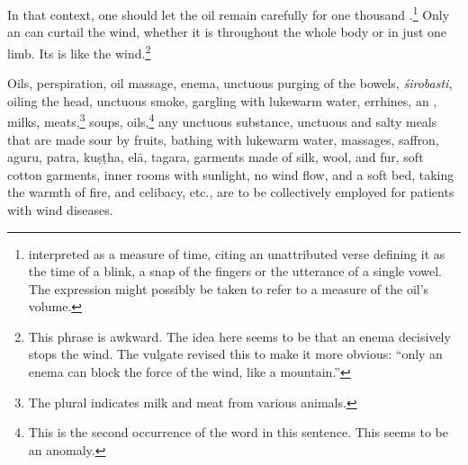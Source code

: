 \begin{translation}
    
    
     \item[20--21ab] 
     
     In that context, one should let the oil remain carefully for 
one thousand .\footnote{
    interpreted  as a measure of time, citing an
    unattributed verse defining it as the time of a blink, a snap of
    the fingers or the utterance of a single vowel. The expression
    might possibly be taken to refer to a measure of the oil's
    volume.} Only an  can curtail the wind,  whether
    it is throughout the whole body or in just one limb.  Its
     is like the wind.\footnote{This phrase is
        awkward. The idea here seems to be that an enema decisively stops
        the wind.  The vulgate revised this to make it more obvious:
        “only an enema can block the force of the wind, like a
        mountain.”}
    

    \item[21cd--26]
    
Oils, perspiration, oil massage, enema, unctuous purging of the
bowels, \emph{śirobasti}, oiling the head, unctuous smoke, gargling
with lukewarm water, errhines, an ,
    milks, meats,\footnote{The plural indicates milk and
        meat from various animals.} soups, oils,\footnote{This is the second
            occurrence of the word  in this sentence. This seems to be
            an anomaly.} any unctuous substance, unctuous and salty meals that
            are made sour by fruits, bathing with lukewarm water, massages,
            saffron, \gls{aguru}, \gls{patra}, \gls{kuṣṭha}, \gls{elā},
            \gls{tagara}, garments made of silk, wool, and fur, soft cotton
            garments, inner rooms with sunlight, no wind flow, and a soft bed,
            taking the warmth of fire, and celibacy, etc., are to be collectively
            employed for patients with wind diseases.

    

    \item[27]
    

\end{translation}

